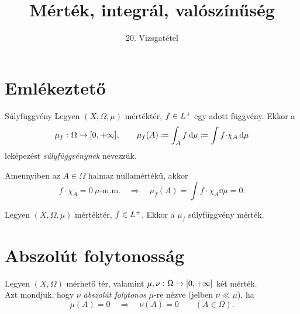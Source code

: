 \documentclass[
]{elteikthesis}[2024/04/26]
\title{Mérték, integrál, valószínűség} %
\subtitle{20. Vizsgatétel}
\begin{document}
	
	
	\section{Emlékeztető}
	
	\begin{definition}{Súlyfüggvény}{}
		Legyen \( (X, \Omega, \mu) \) mértéktér, 
		\( f \in L^+ \) egy adott függvény. Ekkor a
		\[
			\mu_f \,\colon \Omega \to [0, +\infty], \qquad 
			\mu_f(A) \coloneq 
			\int_A f \mathop{}\!\mathrm{d}{\mu} \coloneq 
			\int f {\cdot} \chi_A \mathop{}\!\mathrm{d}{\mu}
		\]
		leképezést \emph{súlyfüggvénynek} nevezzük.
	\end{definition}
	
	\begin{note}
		Amennyiben az \( A \in \Omega \) halmaz nullamértékű, akkor
		\[
			f {\cdot} \chi_A = 0 \ \mu \text{-m.m.}
			\quad \Longrightarrow \quad
			\mu_f(A) = 
			\int f {\cdot} \chi_A \dd{\mu} =
			0.
		\]
	\end{note}
	
	\begin{statement}{}{}
		Legyen \( (X, \Omega, \mu) \) mértéktér, \( f \in L^+ \).
		Ekkor a \( \mu_f \) súlyfüggvény mérték.
	\end{statement}
	
	\section{Abszolút folytonosság}
	
	\begin{definition}{}{}
		Legyen \( (X, \Omega) \) mérhető tér, 
		valamint \( \mu, \nu \,\colon \Omega \to [0, +\infty] \) két mérték.\\[6pt]
		Azt mondjuk, 
		hogy \( \nu \) \emph{abszolút folytonos} \( \mu \)-re nézve (jelben \( \nu \ll \mu \)), ha
		\[
			\mu(A) = 0
			\quad \Longrightarrow \quad
			\nu(A) = 0
			\qquad (A \in \Omega).
		\]
	\end{definition}
	
\end{document}
